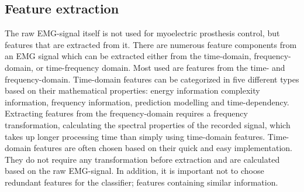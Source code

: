 \subsection{Feature extraction}

The raw EMG-signal itself is not used for myoelectric prosthesis control, but features that are extracted from it. %
There are numerous feature components from an EMG signal which can be extracted either from the time-domain, frequency-domain, or time-frequency domain. Most used are features from the time- and frequency-domain. Time-domain features can be categorized in five different types based on their mathematical properties: energy information complexity information, frequency information, prediction modelling and time-dependency. Extracting features from the frequency-domain requires a frequency transformation, calculating the spectral properties of the recorded signal, which takes up longer processing time than simply using time-domain features. 
Time-domain features are often chosen based on their quick and easy implementation. They do not require any transformation before extraction and are calculated based on the raw EMG-signal. In addition, it is important not to choose redundant features for the classifier; features containing similar information. \cite{Phiny2012} 